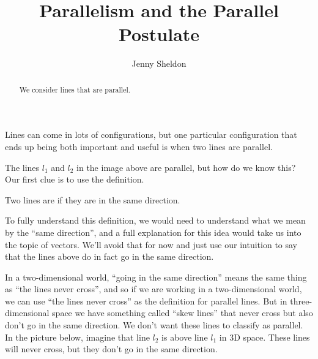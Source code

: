 \documentclass{ximera}
\title{Parallelism and the Parallel Postulate}
\author{Jenny Sheldon}
\begin{document}
\begin{abstract}
We consider lines that are parallel.
\end{abstract}
\maketitle

Lines can come in lots of configurations, but one particular configuration that ends up being both important and useful is when two lines are parallel.
\begin{image}
\end{image}


The lines $l_1$ and $l_2$ in the image above are parallel, but how do we know this? Our first clue is to use the definition.
\begin{definition}
	Two lines are  if they are in the same direction.
\end{definition}

To fully understand this definition, we would need to understand what we mean by the ``same direction'', and a full explanation for this idea would take us into the topic of vectors. We'll avoid that for now and just use our intuition to say that the lines above do in fact go in the same direction.

In a two-dimensional world, ``going in the same direction'' means the same thing as ``the lines never cross'', and so if we are working in a two-dimensional world, we can use ``the lines never cross'' as the definition for parallel lines. But in three-dimensional space we have something called ``skew lines'' that never cross but also don't go in the same direction. We don't want these lines to classify as parallel. In the picture below, imagine that line $l_2$ is above line $l_1$ in 3D space. These lines will never cross, but they don't go in the same direction.
\begin{image}
\end{image} 
\end{document}
